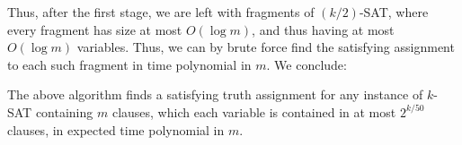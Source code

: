 
Thus, after the first stage, we are left with fragments of
$(k/2)$-SAT, where every fragment has size at most
$O(\log{m})$, and thus having at most $O(\log{m})$
variables. Thus, we can by brute force find the satisfying
assignment to each such fragment in time polynomial in
$m$. We conclude:

\begin{theorem}
    The above algorithm finds a satisfying truth assignment
    for any instance of $k$-SAT containing $m$ clauses,
    which each variable is contained in at most $2^{k/50}$
    clauses, in expected time polynomial in $m$.
\end{theorem}






% 
%


\ChapterEnd{}

